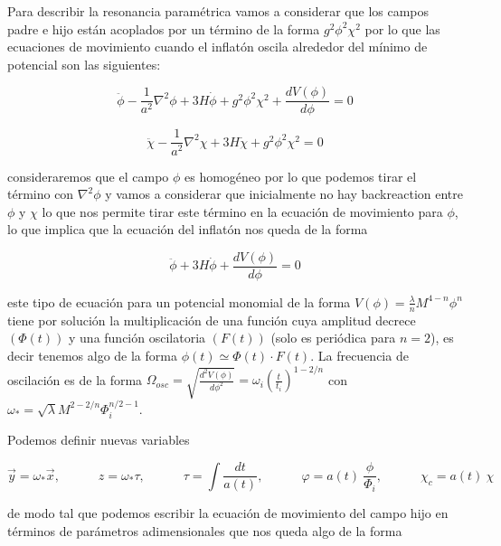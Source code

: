 Para describir la resonancia paramétrica vamos a considerar que los campos padre e hijo están acoplados por un término de la forma $g^2 \phi^2 \chi^2$ por lo que las ecuaciones de movimiento cuando el inflatón oscila alrededor del mínimo de potencial son las siguientes:

\begin{equation}
    \ddot{\phi} - \frac{1}{a^2} \nabla^2 \phi + 3 H \dot{\phi} + g^2 \phi^2 \chi^2 + \frac{d V (\phi)}{d \phi} = 0
\end{equation}

\begin{equation}
    \ddot{\chi} - \frac{1}{a^2} \nabla^2 \chi + 3 H \dot{\chi} + g^2 \phi^2 \chi^2 = 0
\end{equation}

\noindent
consideraremos que el campo $\phi$ es homogéneo por lo que podemos tirar el término con $\nabla^2 \phi$ y vamos a considerar que inicialmente no hay backreaction entre $\phi$ y $\chi$ lo que nos permite tirar este término en la ecuación de movimiento para $\phi$, lo que implica que la ecuación del inflatón nos queda de la forma

\begin{equation}
    \ddot{\phi} + 3 H \dot{\phi} + \frac{d V (\phi)}{d \phi} = 0
\end{equation}

\noindent
este tipo de ecuación para un potencial monomial de la forma $\displaystyle V(\phi) = \frac{\lambda}{n} M^{4 - n} \phi^n$ tiene por solución la multiplicación de una función cuya amplitud decrece $(\Phi(t))$ y una función oscilatoria $(F(t))$ (solo es periódica para $n = 2$), es decir tenemos algo de la forma $\phi(t) \simeq \Phi(t) \cdot F(t)$. La frecuencia de oscilación es de la forma $\Omega_{osc} = \sqrt{\frac{d^2 V(\phi)}{d\phi^2}} = \omega_i \left( \frac{t}{t_i} \right)^{1 - 2/n}$ con $\omega_* = \sqrt{\lambda} M^{2 - 2/n} \Phi_i^{n/2 - 1}$.

Podemos definir nuevas variables

\begin{equation}
    \vec{y} = \omega_* \vec{x}, \quad \quad \quad z = \omega_* \tau, \quad \quad \quad \tau = \int \frac{dt}{a(t)}, \quad \quad \quad \varphi = a(t) ~ \frac{\phi}{\Phi_i}, \quad \quad \quad \chi_c = a(t) ~ \chi
\end{equation}

\noindent
de modo tal que podemos escribir la ecuación de movimiento del campo hijo en términos de parámetros adimensionales que nos queda algo de la forma

